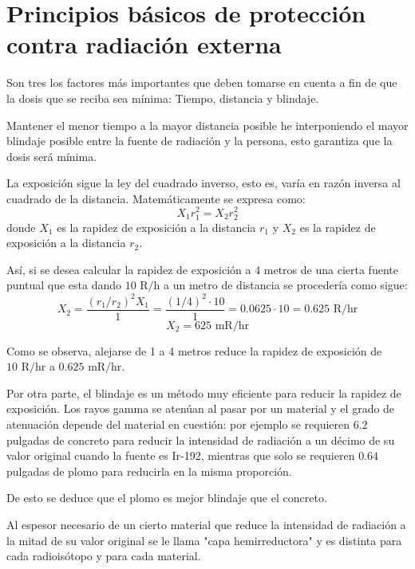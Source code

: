 
\chapter{Principios básicos de protección contra radiación externa}

Son tres los factores más importantes que deben tomarse en cuenta a fin de que la dosis que se reciba sea mínima: Tiempo, distancia y blindaje.

Mantener el menor tiempo a la mayor distancia posible he interponiendo el mayor blindaje posible entre la fuente de radiación y la persona, esto garantiza que la dosis será mínima.

La exposición sigue la ley del cuadrado inverso, esto es, varía en razón inversa al cuadrado de la distancia. Matemáticamente se expresa como:
\[
X_1 r_1^2 = X_2 r_2^2
\]
donde \(X_1\) es la rapidez de exposición a la distancia \(r_1\) y \(X_2\) es la rapidez de exposición a la distancia \(r_2\).

Así, si se desea calcular la rapidez de exposición a 4 metros de una cierta fuente puntual que esta dando \(10 \text{ R/h}\) a un metro de distancia se procedería como sigue:
\[
X_2 = \frac{(r_1/r_2)^2 X_1}{1} = \frac{(1/4)^2 \cdot 10}{1} = 0.0625 \cdot 10 = 0.625 \text{ R/hr}
\]
\[
X_2 = 625 \text{ mR/hr}
\]

Como se observa, alejarse de 1 a 4 metros reduce la rapidez de exposición de \(10 \text{ R/hr}\) a \(0.625 \text{ mR/hr}\).

Por otra parte, el blindaje es un método muy eficiente para reducir la rapidez de exposición. Los rayos gamma se atenúan al pasar por un material y el grado de atenuación depende del material en cuestión: por ejemplo se requieren \(6.2\) pulgadas de concreto para reducir la intensidad de radiación a un décimo de su valor original cuando la fuente es Ir-192, mientras que solo se requieren \(0.64\) pulgadas de plomo para reducirla en la misma proporción.

De esto se deduce que el plomo es mejor blindaje que el concreto.

Al espesor necesario de un cierto material que reduce la intensidad de radiación a la mitad de su valor original se le llama "capa hemirreductora" y es distinta para cada radioisótopo y para cada material.

